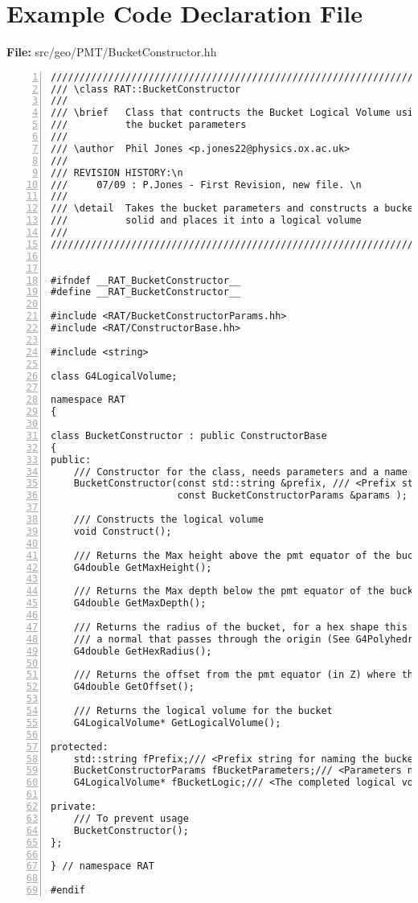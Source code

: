 \documentclass[11pt]{article}
\begin{document}
\section{Example Code Declaration File}
\label{sec:ExampleDec}
{\bf File:} src/geo/PMT/BucketConstructor.hh
\begin{Verbatim}[gobble=0,numbers=left]
////////////////////////////////////////////////////////////////////////
/// \class RAT::BucketConstructor
///
/// \brief   Class that contructs the Bucket Logical Volume using \n
///          the bucket parameters
///
/// \author  Phil Jones <p.jones22@physics.ox.ac.uk>
///
/// REVISION HISTORY:\n
///     07/09 : P.Jones - First Revision, new file. \n
///
/// \detail  Takes the bucket parameters and constructs a bucket \n
///          solid and places it into a logical volume
///
////////////////////////////////////////////////////////////////////////


#ifndef __RAT_BucketConstructor__
#define __RAT_BucketConstructor__

#include <RAT/BucketConstructorParams.hh>
#include <RAT/ConstructorBase.hh>

#include <string>

class G4LogicalVolume;

namespace RAT
{

class BucketConstructor : public ConstructorBase
{
public:
    /// Constructor for the class, needs parameters and a name
    BucketConstructor(const std::string &prefix, /// <Prefix string
                      const BucketConstructorParams &params ); /// <Parameters that define the bucket

    /// Constructs the logical volume
    void Construct();

    /// Returns the Max height above the pmt equator of the bucket
    G4double GetMaxHeight();

    /// Returns the Max depth below the pmt equator of the bucket (note returns a -ive number)
    G4double GetMaxDepth();

    /// Returns the radius of the bucket, for a hex shape this is the distance of the plane that has \n
    /// a normal that passes through the origin (See G4Polyhedra definition).
    G4double GetHexRadius();

    /// Returns the offset from the pmt equator (in Z) where the bucket should be placed
    G4double GetOffset();

    /// Returns the logical volume for the bucket
    G4LogicalVolume* GetLogicalVolume();

protected:
    std::string fPrefix;/// <Prefix string for naming the bucket geometry
    BucketConstructorParams fBucketParameters;/// <Parameters needed to construct
    G4LogicalVolume* fBucketLogic;/// <The completed logical volume

private:
    /// To prevent usage
    BucketConstructor();
};

} // namespace RAT

#endif
\end{Verbatim}
\end{document}

